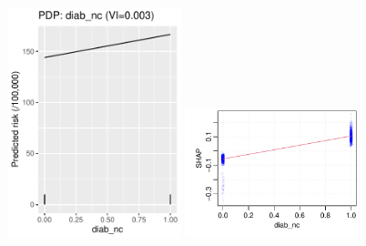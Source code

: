\documentclass[12pt]{article}
\begin{document}
\begin{figure}[h]
\centering
\includegraphics[width=0.45\textwidth]{figures/pdp/diab_nc.pdf}
\includegraphics[width=0.45\textwidth]{figures/shap/diab_nc.pdf}
\end{figure}
\end{document}
